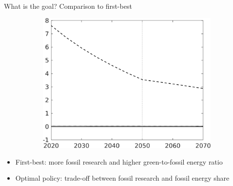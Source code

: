 \documentclass[11pt,aspectratio=169]{beamer}
\begin{document}
\begin{frame}{What is the goal? Comparison to first-best}
\begin{figure}[h!!]
\begin{subfigure}{0.4\textwidth}
		\includegraphics[width=1\textwidth]{../codding_model/own_basedOnFried/optimalPol_010922_revision/figures/all_13Sept22_Tplus30/sffsg_slides_CompEffOPT_T_NoTaus_regime4_opteff_knspil0_spillover0_noskill0_sep0_xgrowth0_countec0_PV1_etaa0.79_lgd0_lff1.png}
	\end{subfigure}
\end{figure}
\pause
\vspace{3mm}
\begin{block}{}
	\begin{itemize}
		\item<+-> First-best: more fossil research and higher green-to-fossil energy ratio
		\item<+-> Optimal policy: trade-off between fossil research and fossil energy share
	\end{itemize}
\end{block}	
\end{frame}
\end{document}
